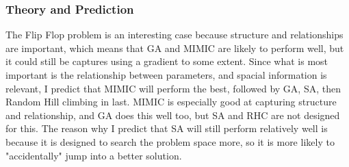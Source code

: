 \documentclass[
	letterpaper, %
]{mlreport}
\begin{document}
\subsubsection{Theory and Prediction}
The Flip Flop problem is an interesting case because structure and relationships are important, which means that GA and MIMIC are likely to perform well, but it could still be captures using a gradient to some extent. Since what is most important is the relationship between parameters, and spacial information is relevant, I predict that MIMIC will perform the best, followed by GA, SA, then Random Hill climbing in last. MIMIC is especially good at capturing structure and relationship, and GA does this well too, but SA and RHC are not designed for this. The reason why I predict that SA will still perform relatively well is because it is designed to search the problem space more, so it is more likely to "accidentally" jump into a better solution.
\end{document}
